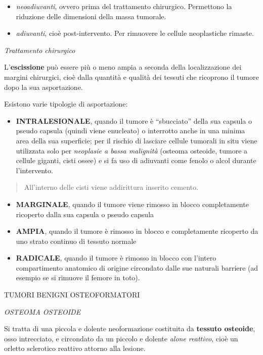 \documentclass[]{article}
\begin{document}
\begin{itemize}
\item
  \emph{neoadiuvanti}, ovvero prima del trattamento chirurgico.
  Permettono la riduzione delle dimensioni della massa tumorale.
\item
  \emph{adiuvanti}, cioè post-intervento. Per rimuovere le cellule
  neoplastiche rimaste.
\end{itemize}

\emph{Trattamento chirurgico}

L'\textbf{escissione} può essere più o meno ampia a seconda della
localizzazione dei margini chirurgici, cioè dalla quantità e qualità dei
tessuti che ricoprono il tumore dopo la sua asportazione.

Esistono varie tipologie di asportazione:

\begin{itemize}
\item
  \textbf{INTRALESIONALE}, quando il tumore è ``sbucciato'' della sua
  capsula o pseudo capsula (quindi viene enucleato) o interrotto anche
  in una minima area della sua superficie; per il rischio di lasciare
  cellule tumorali in situ viene utilizzata solo per \emph{neoplasie a
  bassa malignità} (osteoma osteoide, tumore a cellule giganti, cisti
  ossee) e si fa uso di adiuvanti come fenolo o alcol durante
  l'intervento.
\end{itemize}

\begin{quote}
All'interno delle cisti viene addirittura inserito cemento.
\end{quote}

\begin{itemize}
\item
  \textbf{MARGINALE}, quando il tumore viene rimosso in blocco
  completamente ricoperto dalla sua capsula o pseudo capsula
\item
  \textbf{AMPIA}, quando il tumore è rimosso in blocco e completamente
  ricoperto da uno strato continuo di tessuto normale
\item
  \textbf{RADICALE}, quando il tumore è rimosso in blocco con l'intero
  compartimento anatomico di origine circondato dalle sue naturali
  barriere (ad esempio se si rimuove il femore in toto).
\end{itemize}

TUMORI BENIGNI OSTEOFORMATORI

\emph{OSTEOMA OSTEOIDE}

Si tratta di una piccola e dolente neoformazione costituita da
\textbf{tessuto osteoide}, osso intrecciato, e circondato da un piccolo
e dolente \emph{alone reattivo}, cioè un orletto sclerotico reattivo
attorno alla lesione.
\end{document}
